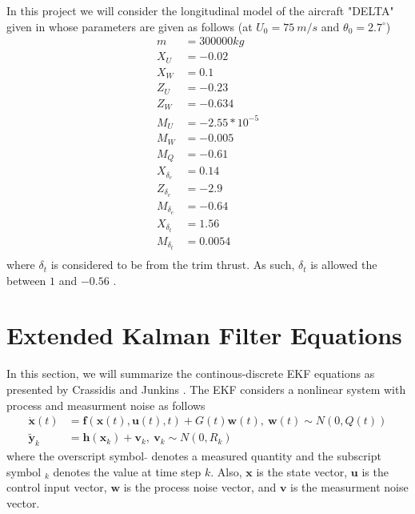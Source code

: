 \documentclass{article}
\begin{document}
In this project we will consider the longitudinal model of the aircraft "DELTA" given in \cite[PP. 561--563]{Mclean}
whose parameters are given as follows (at $U_0 = 75~ m/s$ and $\theta_0 = 2.7 ^\circ$)
\begin{equation}\label{Eq:DELTA_Params}
    \begin{split}
        m &= 300000 kg\\
        X_U &= -0.02\\
        X_W &= 0.1\\
        Z_U &= -0.23\\
        Z_W &= -0.634\\
        M_U &= -2.55*10^{-5}\\
        M_W &= -0.005\\
        M_Q &= -0.61\\
        X_{\delta_e} &= 0.14\\
        Z_{\delta_e} &= -2.9\\
        M_{\delta_e} &= -0.64\\
        X_{\delta_t} &= 1.56\\
        M_{\delta_t} &= 0.0054\\
    \end{split}
\end{equation}
where $\delta_t$ is considered to be from the trim thrust. 
As such, $\delta_t$ is allowed the between $1$ and $-0.56$ \cite{Hassan2016_JAST}.  

\section{Extended Kalman Filter Equations}
In this section, we will summarize the continous-discrete EKF equations as presented by Crassidis and Junkins \cite{Junkins}.
The EKF considers a nonlinear system with process and measurment noise as follows
\begin{equation}
    \begin{split}
        \dot{\bm{x}}(t) &= \bm{f}(\bm{x}(t), \bm{u}(t), t) + G(t) \bm{w}(t),~ \bm{w}(t) \sim N(0, Q(t))\\
        \widetilde{\bm{y}}_k &= \bm{h}(\bm{x}_k) + \bm{v}_k,~ \bm{v}_k \sim N(0, R_k)
    \end{split}
\end{equation}
where the overscript symbol $\widetilde{}$ denotes a measured quantity and the subscript symbol $_k$ denotes the value at time step $k$. 
Also, $\bm{x}$ is the state vector, $\bm{u}$ is the control input vector, $\bm{w}$ is the process noise vector, and $\bm{v}$ is the measurment noise vector.
\end{document}
